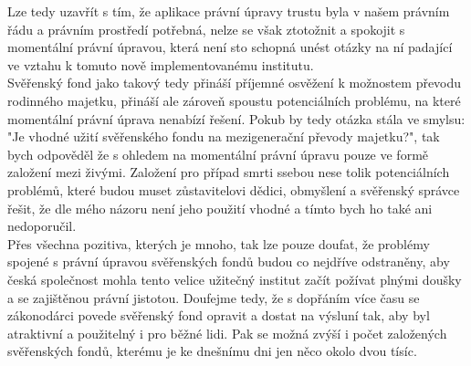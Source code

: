 \documentclass{article}
\begin{document}
Lze tedy uzavřít s tím, že aplikace právní úpravy trustu byla v našem právním řádu a právním prostředí potřebná, nelze se však ztotožnit a spokojit s momentální právní úpravou, která není sto schopná unést otázky na ní padající ve vztahu k tomuto nově implementovanému institutu.\\

Svěřenský fond jako takový tedy přináší příjemné osvěžení k možnostem převodu rodinného majetku, přináší ale zároveň spoustu potenciálních problému, na které momentální právní úprava nenabízí řešení. Pokub by tedy otázka stála ve smylsu: "Je vhodné užití svěřenského fondu na mezigenerační převody majetku?", tak bych odpověděl že s ohledem na momentální právní úpravu pouze ve formě založení mezi živými. Založení pro případ smrti ssebou nese tolik potenciálních problémů, které budou muset zůstavitelovi dědici, obmyšlení a svěřenský správce řešit, že dle mého názoru není jeho použití vhodné a tímto bych ho také ani nedoporučil.\\

Přes všechna pozitiva, kterých je mnoho, tak lze pouze doufat, že problémy spojené s právní úpravou svěřenských fondů budou co nejdříve odstraněny, aby česká společnost mohla tento velice užitečný institut začít požívat plnými doušky a se zajištěnou právní jistotou. Doufejme tedy, že s dopřáním více času se zákonodárci povede svěřenský fond opravit a dostat na výsluní tak, aby byl atraktivní a použitelný i pro běžné lidi. Pak se možná zvýší i počet založených svěřenských fondů, kterému je ke dnešnímu dni jen něco okolo dvou tísíc.\\


\end{document}
